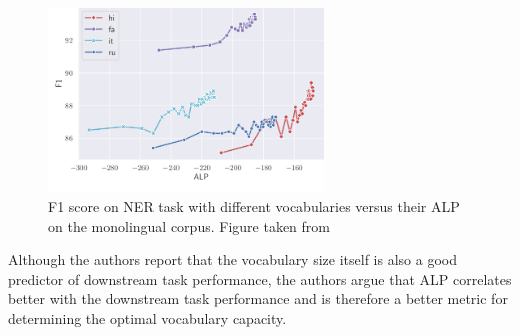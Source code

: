 
\begin{figure}[h]
    \centering
    \includegraphics[width=0.65\textwidth]{img/temp/alp_vs_NER.png}
    \caption{F1 score on NER task with different vocabularies versus their ALP on the monolingual corpus. Figure taken from \cite{zheng_allocating_2021}}
    \label{fig:alp_vs_NER}
\end{figure}

Although the authors report that the vocabulary size itself is also a good predictor of downstream task performance, the authors argue that ALP correlates better with the downstream task performance and is therefore a better metric for determining the optimal vocabulary capacity.



